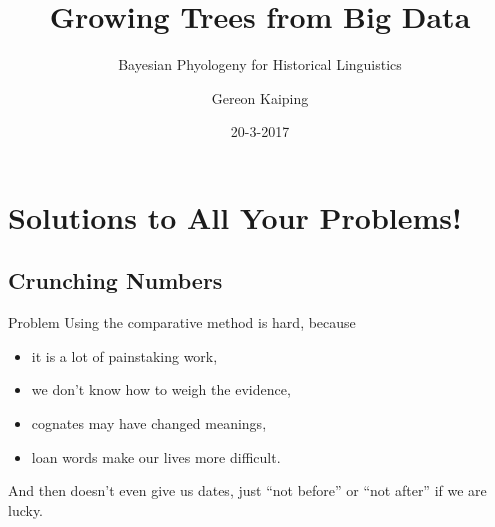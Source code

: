 \documentclass[9pt]{beamer}
\title{Growing Trees from Big Data}
\subtitle{Bayesian Phyologeny for Historical Linguistics}
\author{Gereon Kaiping}
\date{20-3-2017}
\begin{document}
\begin{frame}[plain]
  \titlepage
\end{frame}
\begin{frame}
  \tableofcontents
\end{frame}
\section{Solutions to All Your Problems!}
\subsection{Crunching Numbers}
\begin{frame}{Problem}
  Using the comparative method is hard, because
  \begin{itemize}
  \item it is a lot of painstaking work,
  \item we don't know how to weigh the evidence,
  \item cognates may have changed meanings,
  \item loan words make our lives more difficult.
  \end{itemize}
  And then doesn't even give us dates, just “not before” or “not after” if we are lucky.
\end{frame}
\end{document}
